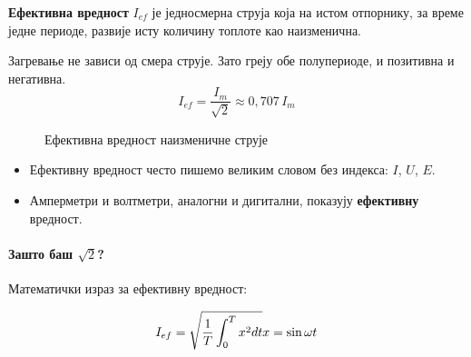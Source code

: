 \documentclass{article}
\begin{document}
\textbf{Ефективна вредност} $I_{ef}$ је једносмерна струја која на истом отпорнику, за време једне периоде, развије исту количину топлоте као наизменична.

Загревање не зависи од смера струје. Зато греју обе полупериоде, и позитивна и негативна.
\begin{equation}
    I_{ef} = \frac{I_m}{\sqrt{2}} \approx 0{,}707\,I_m
\end{equation}

\begin{figure}[H]
    \centering
    \caption{Ефективна вредност наизменичне струје}
    \label{fig:efektivna}
\end{figure}

\begin{itemize}
    \item Ефективну вредност често пишемо великим словом без индекса: $I$, $U$, $E$.
    \item Амперметри и волтметри, аналогни и дигитални, показују \textbf{ефективну} вредност.
\end{itemize}

\paragraph{Зашто баш $\sqrt{2}$?} Математички израз за ефективну вредност: 

\begin{equation}
    I_{ef} = \sqrt{ \frac{1}{T} \int_0^Tx^2 dt } \\
    x = \sin \omega t 
\end{equation}
\end{document}
